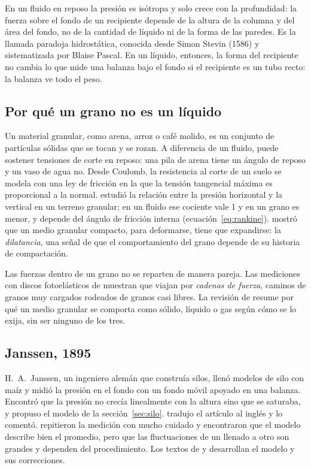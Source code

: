 \documentclass[11pt,a4paper]{article}
\begin{document}
En un fluido en reposo la presión es isótropa y solo crece con la profundidad: la fuerza sobre el fondo de un recipiente depende de la altura de la columna y del área del fondo, no de la cantidad de líquido ni de la forma de las paredes. Es la llamada paradoja hidrostática, conocida desde Simon Stevin (1586) y sistematizada por Blaise Pascal. En un líquido, entonces, la forma del recipiente no cambia lo que mide una balanza bajo el fondo si el recipiente es un tubo recto: la balanza ve todo el peso.

\subsection{Por qué un grano no es un líquido}

Un material granular, como arena, arroz o café molido, es un conjunto de partículas sólidas que se tocan y se rozan. A diferencia de un fluido, puede sostener tensiones de corte en reposo: una pila de arena tiene un ángulo de reposo y un vaso de agua no. Desde Coulomb, la resistencia al corte de un suelo se modela con una ley de fricción en la que la tensión tangencial máxima es proporcional a la normal. \textcite{rankine1857} estudió la relación entre la presión horizontal y la vertical en un terreno granular; en un fluido ese cociente vale 1 y en un grano es menor, y depende del ángulo de fricción interna (ecuación~\eqref{eq:rankine}). \textcite{reynolds1885} mostró que un medio granular compacto, para deformarse, tiene que expandirse: la \emph{dilatancia}, una señal de que el comportamiento del grano depende de su historia de compactación.

Las fuerzas dentro de un grano no se reparten de manera pareja. Las mediciones con discos fotoelásticos de \textcite{majmudar2005} muestran que viajan por \emph{cadenas de fuerza}, caminos de granos muy cargados rodeados de granos casi libres. La revisión de \textcite{jaeger1996} resume por qué un medio granular se comporta como sólido, líquido o gas según cómo se lo exija, sin ser ninguno de los tres.

\subsection{Janssen, 1895}

H.~A.~Janssen, un ingeniero alemán que construía silos, llenó modelos de silo con maíz y midió la presión en el fondo con un fondo móvil apoyado en una balanza. Encontró que la presión no crecía linealmente con la altura sino que se saturaba, y propuso el modelo de la sección~\ref{sec:silo}. \textcite{sperl2006} tradujo el artículo al inglés y lo comentó. \textcite{vanel1999} repitieron la medición con mucho cuidado y encontraron que el modelo describe bien el promedio, pero que las fluctuaciones de un llenado a otro son grandes y dependen del procedimiento. Los textos de \textcite{nedderman1992} y \textcite{duran2000} desarrollan el modelo y sus correcciones.
\end{document}
